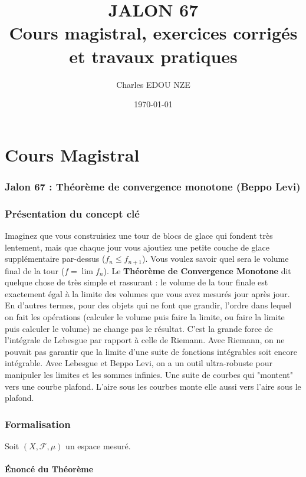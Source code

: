 \documentclass[11pt,a4paper]{article}
\title{\Huge JALON 67 \\ \large Cours magistral, exercices corrigés et travaux pratiques}
\author{\Large Charles EDOU NZE}
\date{\today}
\begin{document}
\maketitle
\tableofcontents
\newpage

\part{Cours Magistral}

\section*{Jalon 67 : Théorème de convergence monotone (Beppo Levi)}

\section{Présentation du concept clé}

Imaginez que vous construisiez une tour de blocs de glace qui fondent très lentement, mais que chaque jour vous ajoutiez une petite couche de glace supplémentaire par-dessus ($f_n \le f_{n+1}$). Vous voulez savoir quel sera le volume final de la tour ($f = \lim f_n$). Le \textbf{Théorème de Convergence Monotone} dit quelque chose de très simple et rassurant : le volume de la tour finale est exactement égal à la limite des volumes que vous avez mesurés jour après jour. En d'autres termes, pour des objets qui ne font que grandir, l'ordre dans lequel on fait les opérations (calculer le volume puis faire la limite, ou faire la limite puis calculer le volume) ne change pas le résultat.
C'est la grande force de l'intégrale de Lebesgue par rapport à celle de Riemann. Avec Riemann, on ne pouvait pas garantir que la limite d'une suite de fonctions intégrables soit encore intégrable. Avec Lebesgue et Beppo Levi, on a un outil ultra-robuste pour manipuler les limites et les sommes infinies.
Une suite de courbes qui "montent" vers une courbe plafond. L'aire sous les courbes monte elle aussi vers l'aire sous le plafond.

\section{Formalisation}

Soit $(X, \mathcal{F}, \mu)$ un espace mesuré.

\subsection{Énoncé du Théorème}
\end{document}
